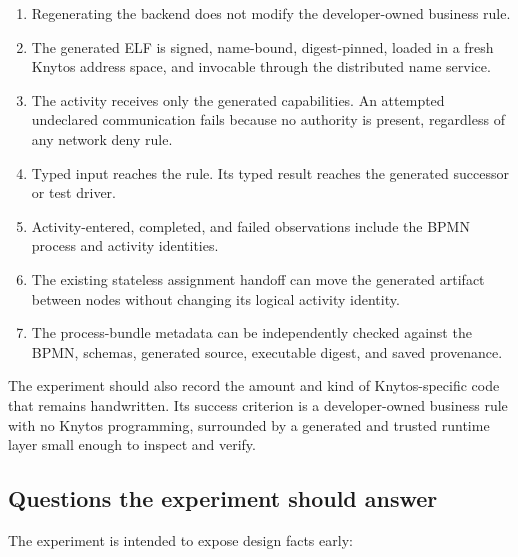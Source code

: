 \begin{enumerate}
    \item Regenerating the backend does not modify the developer-owned business
        rule.

    \item The generated ELF is signed, name-bound, digest-pinned, loaded in a
        fresh Knytos address space, and invocable through the distributed
        name service.

    \item The activity receives only the generated capabilities. An attempted
        undeclared communication fails because no authority is present, regardless
        of any network deny rule.

    \item Typed input reaches the rule. Its typed result reaches the generated
        successor or test driver.

    \item Activity-entered, completed, and failed observations include the BPMN
        process and activity identities.

    \item The existing stateless assignment handoff can move the generated
        artifact between nodes without changing its logical activity identity.

    \item The process-bundle metadata can be independently checked against the
        BPMN, schemas, generated source, executable digest, and saved
        provenance.
\end{enumerate}

The experiment should also record the amount and kind of Knytos-specific
code that remains handwritten. Its success criterion is a developer-owned
business rule with no Knytos programming, surrounded by a generated and
trusted runtime layer small enough to inspect and verify.

\subsection{Questions the experiment should answer}

The experiment is intended to expose design facts early:

